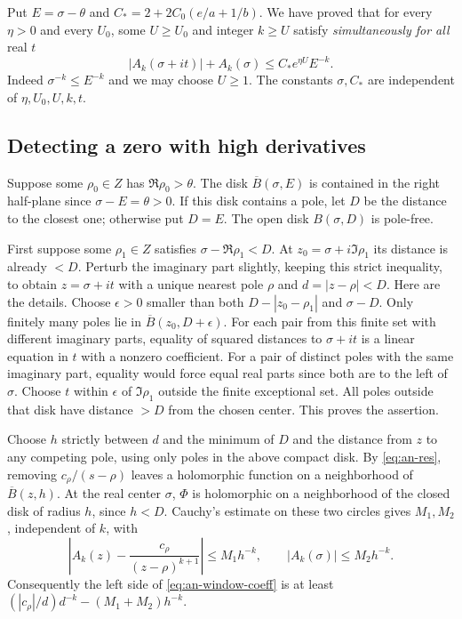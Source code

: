 Put \(E=\sigma-\theta\) and \(C_*=2+2C_0(e/a+1/b)\). We have proved
that for every \(\eta>0\) and every \(U_0\), some \(U\geq U_0\) and
integer \(k\geq U\) satisfy \emph{simultaneously for all} real \(t\)
\begin{equation}
 |A_k(\sigma+it)|+A_k(\sigma)\leq C_*e^{\eta U}E^{-k}.
 \label{eq:an-window-coeff}
\end{equation}
Indeed \(\sigma^{-k}\leq E^{-k}\) and we may choose \(U\geq1\).
The constants \(\sigma,C_*\) are independent of \(\eta,U_0,U,k,t\).

\subsection{Detecting a zero with high derivatives}

Suppose some \(\rho_0\in Z\) has \(\Re\rho_0>\theta\). The disk
\(\overline B(\sigma,E)\) is contained in the right half-plane since
\(\sigma-E=\theta>0\). If this disk contains a pole, let \(D\) be the
distance to the closest one; otherwise put \(D=E\). The open disk
\(B(\sigma,D)\) is pole-free.

First suppose some \(\rho_1\in Z\) satisfies \(\sigma-\Re\rho_1<D\).
At \(z_0=\sigma+i\Im\rho_1\) its distance is already \(<D\). Perturb
the imaginary part slightly, keeping this strict inequality, to obtain
\(z=\sigma+it\) with a unique nearest pole \(\rho\) and
\(d=|z-\rho|<D\). Here are the details. Choose \(\epsilon>0\) smaller
than both \(D-|z_0-\rho_1|\) and \(\sigma-D\). Only finitely many
poles lie in \(\overline B(z_0,D+\epsilon)\). For each pair from this
finite set with different imaginary parts, equality of squared distances
to \(\sigma+it\) is a linear equation in \(t\) with a nonzero coefficient.
For a pair of distinct poles with the same imaginary part, equality
would force equal real parts since both are to the left of \(\sigma\).
Choose \(t\) within \(\epsilon\) of \(\Im\rho_1\) outside the finite
exceptional set. All poles outside that disk have distance \(>D\)
from the chosen center. This proves the assertion.

Choose \(h\) strictly between \(d\) and the minimum of \(D\) and the
distance from \(z\) to any competing pole, using only poles in the
above compact disk. By \eqref{eq:an-res}, removing \(c_\rho/(s-\rho)\)
leaves a holomorphic function on a neighborhood of \(\overline B(z,h)\).
At the real center \(\sigma\), \(\Phi\) is holomorphic on a neighborhood
of the closed disk of radius \(h\), since \(h<D\). Cauchy's estimate on
these two circles gives \(M_1,M_2\), independent of \(k\), with
\[
 \left|A_k(z)-\frac{c_\rho}{(z-\rho)^{k+1}}\right|\leq M_1 h^{-k},
 \qquad |A_k(\sigma)|\leq M_2h^{-k}.
\]
Consequently the left side of \eqref{eq:an-window-coeff} is at
least \((|c_\rho|/d)d^{-k}-(M_1+M_2)h^{-k}\).

